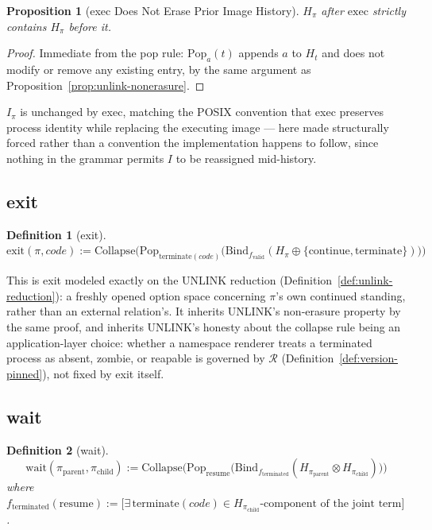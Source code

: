 \documentclass[11pt]{article}
\newtheorem{definition}{Definition}[section]
\newtheorem{proposition}{Proposition}[section]
\begin{document}
\begin{proposition}[exec Does Not Erase Prior Image History]
\label{prop:exec-nonerasure}
$H_\pi$ after $\mathrm{exec}$ strictly contains $H_\pi$ before it.
\end{proposition}
\begin{proof}
Immediate from the pop rule: $\mathrm{Pop}_a(t)$ appends $a$ to $H_t$ and does not modify or remove any existing entry, by the same argument as Proposition~\ref{prop:unlink-nonerasure}.
\end{proof}

$I_\pi$ is unchanged by exec, matching the POSIX convention that exec preserves process identity while replacing the executing image --- here made structurally forced rather than a convention the implementation happens to follow, since nothing in the grammar permits $I$ to be reassigned mid-history.

\subsection{exit}

\begin{definition}[exit]
\label{def:exit}
$\mathrm{exit}(\pi, \mathit{code}) := \mathrm{Collapse}\Big(
\mathrm{Pop}_{\mathrm{terminate}(\mathit{code})}\big(
\mathrm{Bind}_{f_{\mathrm{valid}}}(H_\pi \oplus \{\mathrm{continue}, \mathrm{terminate}\})
\big)\Big)$
\end{definition}

This is exit modeled exactly on the UNLINK reduction (Definition~\ref{def:unlink-reduction}): a freshly opened option space concerning $\pi$'s own continued standing, rather than an external relation's. It inherits UNLINK's non-erasure property by the same proof, and inherits UNLINK's honesty about the collapse rule being an application-layer choice: whether a namespace renderer treats a terminated process as absent, zombie, or reapable is governed by $\mathcal{R}$ (Definition~\ref{def:version-pinned}), not fixed by exit itself.

\subsection{wait}

\begin{definition}[wait]
\label{def:wait}
\[
\mathrm{wait}(\pi_{\mathrm{parent}}, \pi_{\mathrm{child}}) :=
\mathrm{Collapse}\Big(
\mathrm{Pop}_{\mathrm{resume}}\big(
\mathrm{Bind}_{f_{\mathrm{terminated}}}(H_{\pi_{\mathrm{parent}}} \otimes H_{\pi_{\mathrm{child}}})
\big)
\Big)
\]
where $f_{\mathrm{terminated}}(\mathrm{resume}) := \big[\exists\, \mathrm{terminate}(\mathit{code}) \in H_{\pi_{\mathrm{child}}} \text{-component of the joint term}\big]$.
\end{definition}
\end{document}
